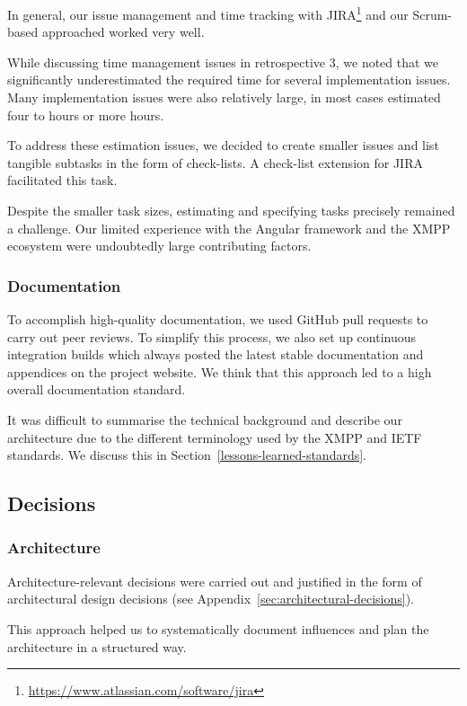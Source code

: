 In general, our issue management and time tracking with JIRA\footnote{\url{https://www.atlassian.com/software/jira}} and our Scrum-based approached worked very well.

While discussing time management issues in retrospective 3, we noted that we significantly underestimated the required time for several implementation issues.
Many implementation issues were also relatively large, in most cases estimated four to hours or more hours.

To address these estimation issues, we decided to create smaller issues and list tangible subtasks in the form of check-lists.
A check-list extension for JIRA facilitated this task.

Despite the smaller task sizes, estimating and specifying tasks precisely remained a challenge.
Our limited experience with the Angular framework and the XMPP ecosystem were undoubtedly large contributing factors.

\subsubsection{Documentation}

To accomplish high-quality documentation, we used GitHub pull requests to carry out peer reviews.
To simplify this process, we also set up continuous integration builds which always posted the latest stable documentation and appendices on the project website.
We think that this approach led to a high overall documentation standard.

It was difficult to summarise the technical background and describe our architecture due to the different terminology used by the XMPP and IETF standards.
We discuss this in Section~\ref{lessons-learned-standards}.

\subsection{Decisions}
\subsubsection{Architecture}

Architecture-relevant decisions were carried out and justified in the form of architectural design decisions \cite{architectural-design-decisions} (see Appendix~\ref{sec:architectural-decisions}).

This approach helped us to systematically document influences and plan the architecture in a structured way.

